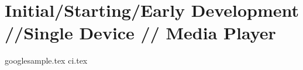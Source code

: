\chapter{Initial/Starting/Early Development //Single Device // Media Player}
{googlesample.tex}
{ci.tex}
